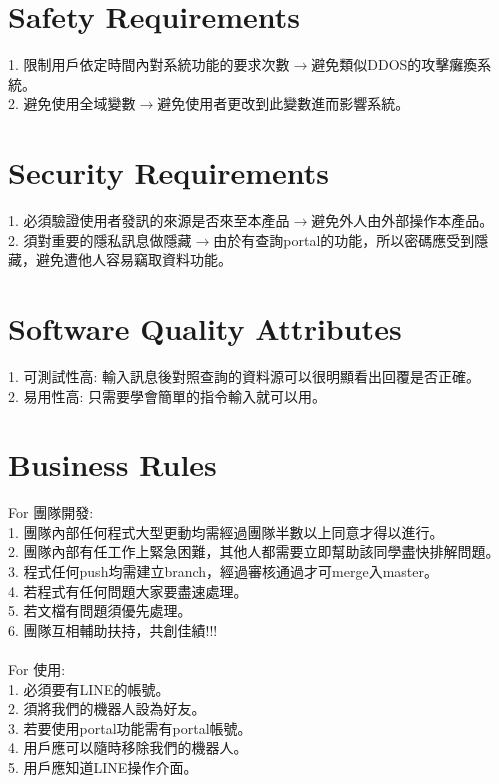 \documentclass{scrreprt}
\begin{document}
\begin{CJK}{UTF8}{bkai}
\section{Safety Requirements}
1.  限制用戶依定時間內對系統功能的要求次數$\rightarrow$避免類似DDOS的攻擊癱瘓系統。\\
2.  避免使用全域變數$\rightarrow$避免使用者更改到此變數進而影響系統。\\

\section{Security Requirements}
1.  必須驗證使用者發訊的來源是否來至本產品$\rightarrow$避免外人由外部操作本產品。\\
2.  須對重要的隱私訊息做隱藏$\rightarrow$由於有查詢portal的功能，所以密碼應受到隱藏，避免遭他人容易竊取資料功能。\\

\section{Software Quality Attributes}
1.  可測試性高: 輸入訊息後對照查詢的資料源可以很明顯看出回覆是否正確。\\
2.  易用性高: 只需要學會簡單的指令輸入就可以用。\\

\section{Business Rules}
For 團隊開發:\\
1.  團隊內部任何程式大型更動均需經過團隊半數以上同意才得以進行。\\
2.  團隊內部有任工作上緊急困難，其他人都需要立即幫助該同學盡快排解問題。\\
3.  程式任何push均需建立branch，經過審核通過才可merge入master。\\
4.  若程式有任何問題大家要盡速處理。\\
5.  若文檔有問題須優先處理。\\
6.  團隊互相輔助扶持，共創佳績!!!\\\\
For 使用:\\
1.  必須要有LINE的帳號。\\
2.  須將我們的機器人設為好友。\\
3.  若要使用portal功能需有portal帳號。\\
4.  用戶應可以隨時移除我們的機器人。\\
5.  用戶應知道LINE操作介面。\\


\end{CJK}
\end{document}
